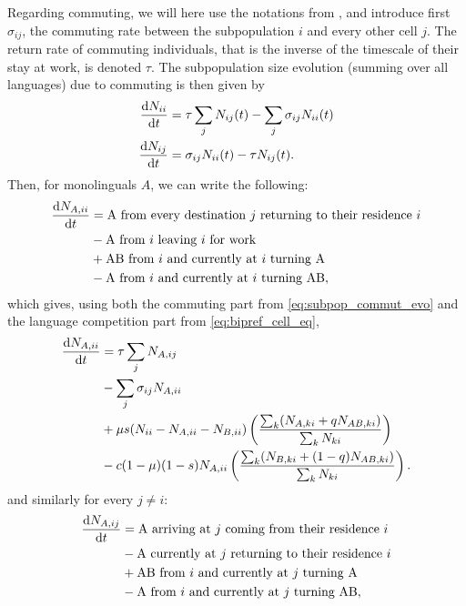 \documentclass[../thesis.tex]{subfiles}
\begin{document}
Regarding commuting, we will here use the notations from
\cite{BalcanModelingSpatial2010}, and introduce first $\sigma_{ij}$, the commuting rate
between the subpopulation $i$ and every other cell $j$. The return rate of commuting
individuals, that is the inverse of the timescale of their stay at work, is denoted
$\tau$. The subpopulation size evolution (summing over all languages) due to commuting
is then given by
\begin{equation}
\label{eq:subpop_commut_evo}
  \begin{aligned}
    \dv{N_{ii}}{t}
      &= \tau \sum_j N_{ij} (t) - \sum_j \sigma_{ij} N_{ii} (t)  \\
    \dv{N_{ij}}{t}
      &= \sigma_{ij} N_{ii} (t) - \tau N_{ij} (t).
  \end{aligned}
\end{equation}
Then, for monolinguals $A$, we can write the following:
\begin{equation}
  \begin{aligned}
    \dv{N_{A,ii}}{t}
      &= \text{A from every destination $j$ returning to their residence $i$} \\
      &- \text{A from $i$ leaving $i$ for work} \\
      &+ \text{AB from $i$ and currently at $i$ turning A} \\
      &- \text{A from $i$ and currently at $i$ turning AB},
  \end{aligned}
\end{equation}
which gives, using both the commuting part from \cref{eq:subpop_commut_evo} and the
language competition part from \cref{eq:bipref_cell_eq},
\begin{equation}
\label{eq:N_Aii_evo}
  \begin{aligned}
    \dv{N_{A,ii}}{t} 
      &= \tau \sum_j N_{A, ij} \\
      &- \sum_j \sigma_{ij} N_{A,ii} \\
      &+ \mu s (N_{ii} - N_{A, ii} - N_{B, ii}) \left( \frac{\sum_k (N_{A, ki} + q N_{AB, ki})}{\sum_k N_{ki}} \right)\\
      &- c (1-\mu) (1-s) N_{A, ii}  \left( \frac{\sum_k (N_{B, ki} + (1-q) N_{AB, ki})}{\sum_k N_{ki}} \right).
  \end{aligned}
\end{equation}
and similarly for every $j \neq i$:
\begin{equation}
  \begin{aligned}
    \dv{N_{A,ij}}{t}
      &= \text{A arriving at $j$ coming from their residence $i$} \\
      &- \text{A currently at $j$ returning to their residence $i$} \\
      &+ \text{AB from $i$ and currently at $j$ turning A} \\
      &- \text{A from $i$ and currently at $j$ turning AB},
  \end{aligned}
\end{equation}
\end{document}
